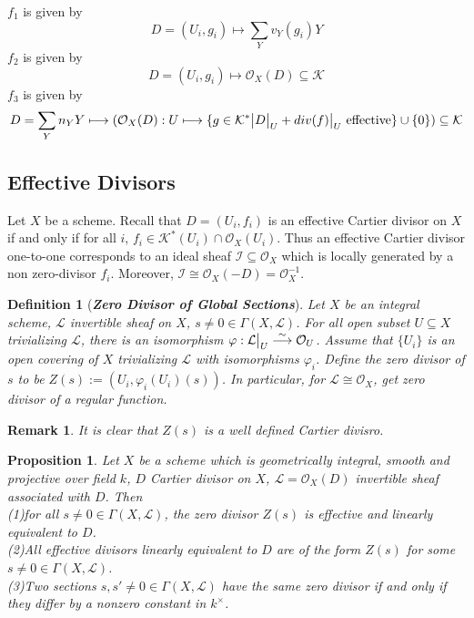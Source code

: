 \documentclass{ctexart}
\newtheorem{definition}{Definition}[section]
\newtheorem{remark}{Remark}[section]
\newtheorem{proposition}{Proposition}[section]
\begin{document}
$f_{1}$ is given by 
\begin{equation*}
    D = (U_{i}, g_{i}) \longmapsto \sum_{Y} v_{Y}(g_{i})Y
\end{equation*}
$f_{2}$ is given by 
\begin{equation*}
    D = (U_{i}, g_{i}) \longmapsto \mathcal{O}_{X}(D) \subseteq \mathcal{K}
\end{equation*}
$f_{3}$ is given by
\begin{equation*}
    D = \sum_{Y} n_{Y}Y \longmapsto (\mathcal{O}_{X}(D): U \longmapsto \{g\in \mathcal{K}^{\ast} \big{|} D\big{|}_{U} + div(f)\big{|}_{U} \text{ effective}\} \cup \{0\}) \subseteq \mathcal{K}
\end{equation*}
\subsection{Effective Divisors}
Let $X$ be a scheme.
Recall that $D = (U_{i}, f_{i})$ is an effective Cartier divisor on $X$ if and only if for all $i$, $f_{i}\in \mathcal{K}^{\ast}(U_{i}) \cap \mathcal{O}_{X}(U_{i})$.
Thus an effective Cartier divisor one-to-one corresponds to an ideal sheaf $\mathcal{I} \subseteq \mathcal{O}_{X}$ which is locally generated by a non zero-divisor $f_{i}$.
Moreover, $\mathcal{I} \cong \mathcal{O}_{X}(-D) = \mathcal{O}_{X}^{-1}$.
\begin{definition}[\textbf{\emph{Zero Divisor of Global Sections}}]
    Let $X$ be an integral scheme, $\mathcal{L}$ invertible sheaf on $X$, $s \neq 0\in \Gamma(X, \mathcal{L})$.
    For all open subset $U \subseteq X$ trivializing $\mathcal{L}$, there is an isomorphism $\varphi: \mathcal{L}\big{|}_{U} \overset{\sim}{\longrightarrow} \mathcal{O}_{U}$.
    Assume that $\{U_{i}\}$ is an open covering of $X$ trivializing $\mathcal{L}$ with isomorphisms $\varphi_{i}$.
    Define the zero divisor of $s$ to be $Z(s) := (U_{i}, \varphi_{i}(U_{i})(s))$.
    In particular, for $\mathcal{L} \cong \mathcal{O}_{X}$, get zero divisor of a regular function.
\end{definition}
\begin{remark}
    It is clear that $Z(s)$ is a well defined Cartier divisro.
\end{remark}
\begin{proposition}
    Let $X$ be a scheme which is geometrically integral, smooth and projective over field $k$, $D$ Cartier divisor on $X$, $\mathcal{L} = \mathcal{O}_{X}(D)$ invertible sheaf associated with $D$.
    Then \\
    (1)for all $s \neq 0\in \Gamma(X, \mathcal{L})$, the zero divisor $Z(s)$ is effective and linearly equivalent to $D$. \\
    (2)All effective divisors linearly equivalent to $D$ are of the form $Z(s)$ for some $s \neq 0\in \Gamma(X, \mathcal{L})$. \\
    (3)Two sections $s,s' \neq 0\in \Gamma(X, \mathcal{L})$ have the same zero divisor if and only if they differ by a nonzero constant in $k^{\times}$.
    \label{Proposition 8.6}
\end{proposition}
\end{document}
